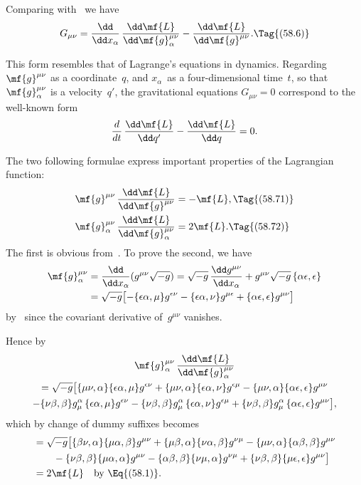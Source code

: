 \documentclass[12pt]{book}
\begin{document}
Comparing with~ we have
\[
G_{\mu\nu} = \frac{\dd}{\dd x_{\alpha}}\, \frac{\dd\mf{L}}{\dd\mf{g}_{\alpha}^{\mu\nu}} - \frac{\dd\mf{L}}{\dd\mf{g}^{\mu\nu}}.
\Tag{(58.6)}
\]

This form resembles that of Lagrange's equations in dynamics. Regarding
%
$\mf{g}^{\mu\nu}$ as a coordinate~$q$, and $x_{\alpha}$~as a four-dimensional time~$t$, so that $\mf{g}_{\alpha}^{\mu\nu}$ is a velocity~$q'$,
the gravitational equations $G_{\mu\nu} = 0$ correspond to the well-known form
\[
\frac{d}{dt}\, \frac{\dd\mf{L}}{\dd q'} - \frac{\dd\mf{L}}{\dd q} = 0.
\]

The two following formulae express important properties of the Lagrangian
function:
\begin{align*}
  \mf{g}^{\mu\nu}\, \frac{\dd\mf{L}}{\dd\mf{g}^{\mu\nu}}
  &= -\mf{L},
  \Tag{(58.71)} \\
  \mf{g}_{\alpha}^{\mu\nu}\, \frac{\dd\mf{L}}{\dd\mf{g}_{\alpha}^{\mu\nu}}
  &= 2\mf{L}.
  \Tag{(58.72)}
\end{align*}
The first is obvious from~. To prove the second, we have
\begin{align*}
  \mf{g}_{\alpha}^{\mu\nu}
  &= \frac{\dd}{\dd x_{\alpha}} (g^{\mu\nu} \sqrt{-g})
  = \sqrt{-g}\, \frac{\dd g^{\mu\nu}}{\dd x_{\alpha}} + g^{\mu\nu} \sqrt{-g}\, \{\alpha\epsilon, \epsilon\} \\
  &= \sqrt{-g} \bigl[-\{\epsilon\alpha, \mu\} g^{\epsilon\nu}
    - \{\epsilon\alpha, \nu\} g^{\mu\epsilon}
    + \{\alpha\epsilon, \epsilon\} g^{\mu\nu}\bigr]
\end{align*}
by~ since the covariant derivative of~$g^{\mu\nu}$ vanishes.

Hence by~
\begin{multline*}
  \mf{g}_{\alpha}^{\mu\nu}\, \frac{\dd\mf{L}}{\dd\mf{g}_{\alpha}^{\mu\nu}} \\
  = \sqrt{-g} \bigl[
    \{\mu\nu, \alpha\} \{\epsilon\alpha, \mu\} g^{\epsilon\nu}
    + \{\mu\nu, \alpha\} \{\epsilon\alpha, \nu\} g^{\epsilon\mu}
    - \{\mu\nu, \alpha\} \{\alpha\epsilon, \epsilon\} g^{\mu\nu} \\
    - \{\nu\beta, \beta\} g_{\mu}^{\alpha}\, \{\epsilon\alpha, \mu\} g^{\epsilon\nu}
    - \{\nu\beta, \beta\} g_{\mu}^{\alpha}\, \{\epsilon\alpha, \nu\} g^{\epsilon\mu}
    + \{\nu\beta, \beta\} g_{\mu}^{\alpha}\, \{\alpha\epsilon, \epsilon\} g^{\mu\nu}\bigr],
\end{multline*}
which by change of dummy suffixes becomes
\begin{align*}
  &= \sqrt{-g} \bigl[
      \{\beta\nu, \alpha\} \{\mu\alpha, \beta\} g^{\mu\nu}
    + \{\mu\beta, \alpha\} \{\nu\alpha, \beta\} g^{\nu\mu}
    - \{\mu\nu, \alpha\} \{\alpha\beta, \beta\} g^{\mu\nu} \\
    &\qquad
    - \{\nu\beta, \beta\} \{\mu\alpha, \alpha\} g^{\mu\nu}
    - \{\alpha\beta, \beta\} \{\nu\mu, \alpha\} g^{\nu\mu}
    + \{\nu\beta, \beta\} \{\mu\epsilon, \epsilon\} g^{\mu\nu}\bigr] \\
  &= 2\mf{L}\quad\text{by~\Eq{(58.1)}.}
\end{align*}
\end{document}
